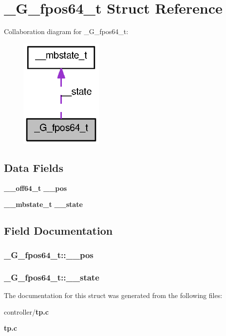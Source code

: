 \section{\_\-G\_\-fpos64\_\-t Struct Reference}
\label{struct__G__fpos64__t}


Collaboration diagram for \_\-G\_\-fpos64\_\-t:
\nopagebreak
\begin{figure}[H]
\begin{center}
\leavevmode
\includegraphics[width=116pt]{struct__G__fpos64__t__coll__graph}
\end{center}
\end{figure}
\subsection*{Data Fields}
\begin{DoxyCompactItemize}
\item 
{\bf \_\-\_\-off64\_\-t} {\bf \_\-\_\-pos}
\item 
{\bf \_\-\_\-mbstate\_\-t} {\bf \_\-\_\-state}
\end{DoxyCompactItemize}


\subsection{Field Documentation}
\subsubsection[{\_\-\_\-pos}]{ {\bf \_\-G\_\-fpos64\_\-t::\_\-\_\-pos}}\label{struct__G__fpos64__t_a5e289da2680acfd68c15e8f96524a091}
\subsubsection[{\_\-\_\-state}]{ {\bf \_\-G\_\-fpos64\_\-t::\_\-\_\-state}}\label{struct__G__fpos64__t_ac06ed638762dc499046cf91403aa58bb}


The documentation for this struct was generated from the following files:\begin{DoxyCompactItemize}
\item 
controller/{\bf tp.c}\item 
{\bf tp.c}\end{DoxyCompactItemize}
